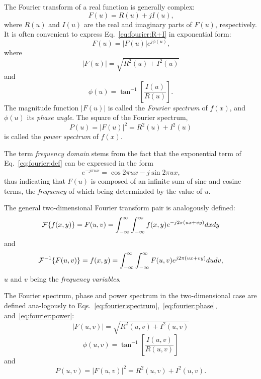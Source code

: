 The Fourier transform of a real function is generally complex:
\begin{equation}
\label{eq:fourier:R+I}
  F(u)=R(u)+jI(u)\mbox{,}
\end{equation}
where $R(u)$ and $I(u)$ are the real and imaginary parts of $F(u)$,
respectively.  It is often convenient to express
Eq.~\ref{eq:fourier:R+I} in exponential form:
\begin{equation}
  F(u)=|F(u)|e^{j\phi(u)}\mbox{,}
\end{equation}
where
\begin{equation}
\label{eq:fourier:spectrum}
  |F(u)|=\sqrt{R^{2}(u)+I^{2}(u)}
\end{equation}
and
\begin{equation}
\label{eq:fourier:phase}
  \phi(u)=\tan^{-1}\left[\frac{I(u)}{R(u)}\right]\mbox{.}
\end{equation}
The magnitude function $|F(u)|$ is called the {\em Fourier spectrum\/}
of $f(x)$, and $\phi(u)$ its {\em phase angle\/}.  The square of the
Fourier spectrum,
\begin{equation}
\label{eq:fourier:power}
  P(u)=|F(u)|^{2}=R^{2}(u)+I^{2}(u)
\end{equation}
is called the {\em power spectrum\/} of $f(x)$.

The term {\em frequency domain\/} stems from the fact that the
exponential term of Eq.~\ref{eq:fourier:def} can be expressed in the
form
\begin{equation}
  e^{-j\pi ux}=\cos 2\pi ux-j\sin 2\pi ux\mbox{,}
\end{equation}
thus indicating that $F(u)$ is composed of an infinite sum of sine and
cosine terms, the {\em frequency\/} of which being determinded by the
value of $u$.

The general two-dimensional Fourier transform pair is analogously
defined:
\begin{equation}
  {\cal F}\{f(x,y)\}=F(u,v)=\int_{-\infty}^{\infty}
  \int_{-\infty}^{\infty}f(x,y)e^{-j2\pi(ux+vy)}dxdy
\end{equation}
and
\begin{equation}
  {\cal F}^{-1}\{F(u,v)\}=f(x,y)=\int_{-\infty}^{\infty}
  \int_{-\infty}^{\infty}F(u,v)e^{j2\pi(ux+vy)}dudv\mbox{,}
\end{equation}
$u$ and $v$ being the {\em frequency variables\/}.

The Fourier spectrum, phase and power spectrum in the two-dimensional
case are defined ana-logously to
Eqs.~\ref{eq:fourier:spectrum},~\ref{eq:fourier:phase},
and~\ref{eq:fourier:power}:
\begin{equation}
\label{eq:fourier:spectrum2}
  |F(u,v)|=\sqrt{R^{2}(u,v)+I^{2}(u,v)}
\end{equation}
\begin{equation}
\label{eq:fourier:phase2}
  \phi(u,v)=\tan^{-1}\left[\frac{I(u,v)}{R(u,v)}\right]
\end{equation}
and
\begin{equation}
\label{eq:fourier:power2}
  P(u,v)=|F(u,v)|^{2}=R^{2}(u,v)+I^{2}(u,v)\mbox{.}
\end{equation}


